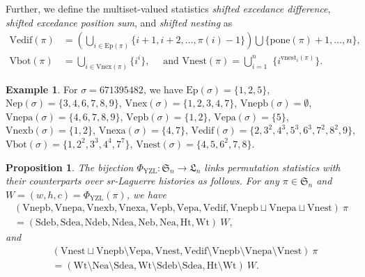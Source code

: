 \documentclass[12pt]{amsart}
\numberwithin{equation}{section}
\theoremstyle{plain}
\newtheorem{proposition}[theorem]{Proposition}
\theoremstyle{definition}
\newtheorem{example}[theorem]{Example}
\def\YZL{\mathrm{YZL}}
\def\SS{\mathfrak{S}}
\def\LH{\mathfrak{L}}
\def\Neb{\mathrm{Neb}}
\def\Nea{\mathrm{Nea}}
\def\Sdeb{\mathrm{Sdeb}}
\def\Sdea{\mathrm{Sdea}}
\def\Ndeb{\mathrm{Ndeb}}
\def\Ndea{\mathrm{Ndea}}
\def\Het{\mathrm{Ht}}
\def\Wt{\mathrm{Wt}}
\def\Excp{\mathrm{Ep}}
\def\Nexcp{\mathrm{Nep}}
\def\Vnexpb{\mathrm{Vnepb}}
\def\Vnexpa{\mathrm{Vnepa}}
\def\Vnexb{\mathrm{Vnexb}}
\def\Vnexa{\mathrm{Vnexa}}
\def\Vexpb{\mathrm{Vepb}}
\def\Vexpa{\mathrm{Vepa}}
\def\Vedif{\mathrm{Vedif}}
\def\Vbot{\mathrm{Vbot}}
\def\Vnex{\mathrm{Vnex}}
\def\Vnest{\mathrm{Vnest}}
\def\pone{\mathrm{pone}}
\def\vnest{\mathrm{vnest}}
\begin{document}
Further, we define the multiset-valued statistics
{\em shifted excedance difference}, {\em shifted excedance position sum}, and {\em shifted nesting} as
\begin{align*}
\Vedif(\pi) &=\left(\bigcup_{i \in \Excp(\pi)}\{i+1,i+2, \ldots, \pi(i)-1\} \right) \bigcup \{\pone(\pi)+1,\ldots,n\},\\[3pt]
\Vbot(\pi) &=\bigcup_{i \in \Vnex(\pi)}\{i^{i}\},\,\,\,\,\,\,\,\,\text{and }
\Vnest(\pi)=\bigcup_{i=1}^n \,\,\{i^{\vnest_i(\pi)}\}.
\end{align*}


\begin{example}
For $\sigma=671395482$, we have
$\Excp(\sigma)=\{1,2,5\}$,
$\Nexcp(\sigma)=\{3,4,6,7,8,9\}$,
$\Vnex(\sigma)=\{1,2,3,4,7\}$,
$\Vnexpb(\sigma)=\emptyset$, $\Vnexpa(\sigma)=\{4,6,7,8,9\}$,
$\Vexpb(\sigma)=\{1,2\}$, $\Vexpa(\sigma)=\{5\}$,
$\Vnexb(\sigma)=\{1,2\}$,
$\Vnexa(\sigma)=\{4,7\}$,
$\Vedif(\sigma)=\{2,3^2,4^3,5^3,6^3,7^2,8^2,9\}$,
$\Vbot(\sigma)=\{1,2^2,3^3,4^4,7^7\}$,
$\Vnest(\sigma)=\{4,5,6^2,7,8\}$.
\end{example}


\begin{proposition}\label{prop:YZL}
The bijection $\Phi_{\YZL}:\SS_n\rightarrow \LH_n$  links  permutation statistics with their counterparts over sr-Laguerre histories as follows. For any $\pi\in\SS_n$ and $W=(w,h,c)=\Phi_{\YZL}(\pi)$,
 we have
\begin{align}
\label{eq:YZLSET}
(\Vnexpb,\Vnexpa,\Vnexb,\Vnexa,\Vexpb,\Vexpa,\Vedif,\Vnexpb\sqcup\Vnexpa\sqcup\Vnest)\:\pi \\[3pt]
= (\Sdeb,\Sdea,\Ndeb,\Ndea,\Neb,\Nea, \Het,\Wt)\:W,  \nonumber
\end{align}
and
\begin{align}
&(\Vnest\sqcup \Vnexpb \setminus \Vexpa, \Vnest,
\Vedif\setminus\Vnexpb\setminus\Vnexpa\setminus\Vnest)\:\pi \\
&= ( \Wt\setminus\Nea\setminus\Sdea,
\Wt\setminus\Sdeb\setminus\Sdea,\Het\setminus\Wt)\:W. \nonumber
\end{align}
\end{proposition}
\end{document}

